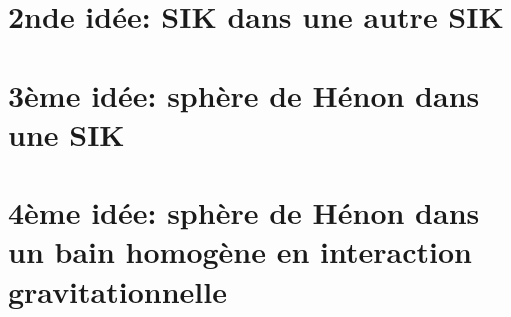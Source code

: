 	\section[2nde idée]{2nde idée: SIK dans une autre SIK}
		
	\section[3ème idée]{3ème idée: sphère de Hénon dans une SIK}
		
	\section[4ème idée]{4ème idée: sphère de Hénon dans un bain homogène en interaction gravitationnelle}
		\label{Simu::Idee4}
		
